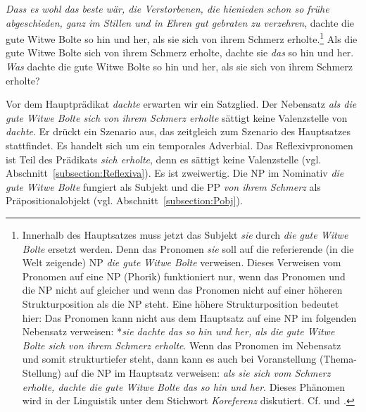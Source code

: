 \ea \label{ea:Busch_Satz_Satzobj}
\ea \label{ea:Busch_Satz_Satzobj_Top} \textit{Dass es wohl das beste wär, die Verstorbenen, die hienieden schon so frühe abgeschieden, ganz im Stillen und in Ehren gut gebraten zu verzehren}, dachte die gute Witwe Bolte so hin und her, als sie sich von ihrem Schmerz erholte.\footnote{Innerhalb des Hauptsatzes muss jetzt das Subjekt \textit{sie} durch \textit{die gute Witwe Bolte} ersetzt werden. Denn das Pronomen \textit{sie} soll auf die referierende (in die Welt zeigende) NP \textit{die gute Witwe Bolte} verweisen. Dieses Verweisen vom Pronomen auf eine NP (Phorik) funktioniert nur, wenn das Pronomen und die NP nicht auf gleicher und wenn das Pronomen nicht auf einer höheren Strukturposition als die NP steht. Eine höhere Strukturposition bedeutet hier: Das Pronomen kann nicht aus dem Hauptsatz auf eine NP im folgenden Nebensatz verweisen: *\textit{sie dachte das so hin und her, als die gute Witwe Bolte sich von ihrem Schmerz erholte}. Wenn das Pronomen im Nebensatz und somit strukturtiefer steht, dann kann es auch bei Voranstellung (Thema-Stellung) auf die NP im Hauptsatz verweisen: \textit{als sie sich vom Schmerz erholte, dachte die gute Witwe Bolte das so hin und her}. Dieses Phänomen wird in der Linguistik unter dem Stichwort \textit{Koreferenz} diskutiert. Cf. \citet[93--104]{FanselowFelix1993} und \citet[109--115]{Welke1993}.} 
\ex \label{ex:Busch_Satz_Satzobj_Pronomen} Als die gute Witwe Bolte sich von ihrem Schmerz erholte, dachte sie \textit{das} so hin und her.
\ex \label{ex:Busch_Satz_Satzobj_Frage} \textit{Was} dachte die gute Witwe Bolte so hin und her,  als sie sich von ihrem Schmerz erholte?
\z 
\z 

Vor dem Hauptprädikat \textit{dachte} erwarten wir ein Satzglied. Der Nebensatz \textit{als die gute Witwe Bolte sich von ihrem Schmerz erholte} sättigt keine Valenzstelle von \textit{dachte}. Er drückt ein Szenario aus, das zeitgleich zum Szenario des Hauptsatzes stattfindet. Es handelt sich um ein temporales Adverbial. Das Reflexivpronomen ist Teil des Prädikats \textit{sich erholte}, denn es sättigt keine Valenzstelle (vgl. Abschnitt~\ref{subsection:Reflexiva}). Es ist zweiwertig. Die NP im Nominativ \textit{die gute Witwe Bolte} fungiert als Subjekt und die PP \textit{von ihrem Schmerz} als Präpositionalobjekt (vgl. Abschnitt~\ref{subsection:Pobj}).

